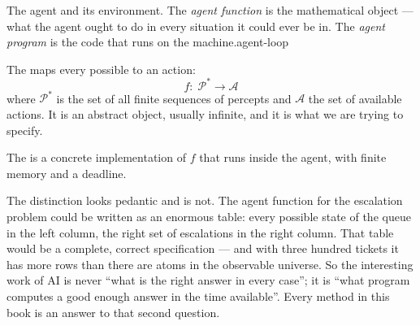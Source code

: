{}%
{The agent and its environment. The \emph{agent function} is the mathematical
object --- what the agent ought to do in every situation it could ever be in. The
\emph{agent program} is the code that runs on the machine.}{agent-loop}

\begin{definitionbox}
The  maps every possible  to an
action:
\[
  f:\; \mathcal{P}^{*} \longrightarrow \mathcal{A}
\]
where $\mathcal{P}^{*}$ is the set of all finite sequences of percepts and
$\mathcal{A}$ the set of available actions. It is an abstract object, usually
infinite, and it is what we are trying to specify.

The  is a concrete implementation of $f$ that runs inside the
agent, with finite memory and a deadline.
\end{definitionbox}

The distinction looks pedantic and is not. The agent function for the escalation
problem could be written as an enormous table: every possible state of the queue in
the left column, the right set of escalations in the right column. That table would
be a complete, correct specification --- and with three hundred tickets it has more
rows than there are atoms in the observable universe. So the interesting work of AI
is never ``what is the right answer in every case''; it is ``what program computes
a good enough answer in the time available''. Every method in this book is an
answer to that second question.

